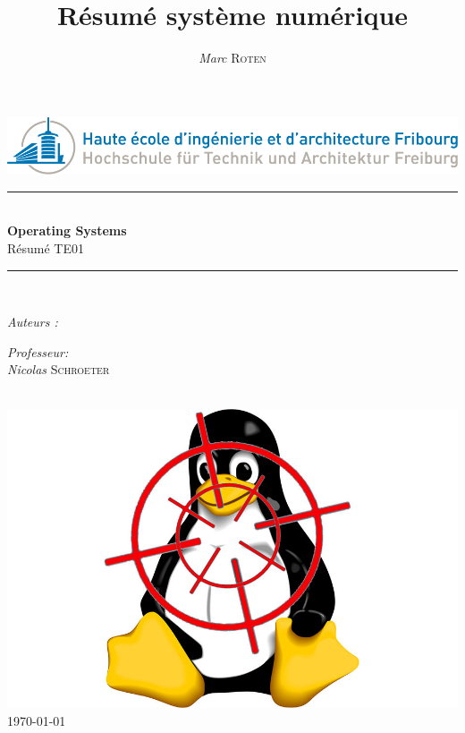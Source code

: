 

\title{Résumé système numérique} 
\author{\textsl{Marc} \textsc{Roten}}
\date{}


    \begin{titlepage}
        \begin{center}
            \includegraphics[scale=.4]{Img/heia-fr-logo.png}\\[1.3cm]
            
            \rule{\linewidth}{0.3mm} \\[0.3cm]
            {\huge \bfseries Operating Systems\\[0.5cm]} 
            {\Large  Résumé TE01 }
            \rule{\linewidth}{0.3mm} \\[0.8cm]
            \noindent{}
            \begin{minipage}[t]{0.4\textwidth}
                \begin{flushleft} \large
                    \emph{Auteurs :}\\
                    \theauthor
                \end{flushleft}
            \end{minipage}
            \begin{minipage}[t]{0.4\textwidth} 
                \begin{flushright} \large
                    \emph{Professeur:}\\
                    \textsl{Nicolas} \textsc{ Schroeter}\\ 
                \end{flushright} 
                \vfill
            \end{minipage}\\[1.3cm]
            \includegraphics[scale=0.4]{Img/title.jpg}\\[1.5cm]
            \vspace*{1\baselineskip}
            \today \\[0.7cm]
        \end{center}
    \end{titlepage}
